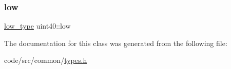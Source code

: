 \mbox{\label{classuint40_a216fde2e6997b39cb34b32daa869cef3}} 
\subsubsection{\texorpdfstring{low}{low}}
{\footnotesize\ttfamily \hyperlink{classuint40_a92fb8d876ca5cf77d4ed86dae0adc2f2}{low\+\_\+type} uint40\+::low\hspace{0.3cm}{\ttfamily [private]}}



The documentation for this class was generated from the following file\+:\begin{DoxyCompactItemize}
\item 
code/src/common/\hyperlink{types_8h}{types.\+h}\end{DoxyCompactItemize}
